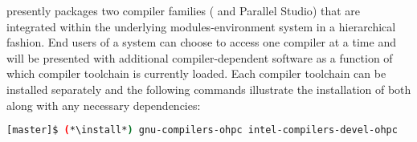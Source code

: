 \OHPC{} presently packages two compiler families ({\GNU{}} and {\Intel{}
  Parallel Studio}) that are integrated within the underlying
modules-environment system in a hierarchical fashion. End users of a \OHPC{}
system can choose to access one compiler at a time and will be presented with
additional compiler-dependent software as a function of which compiler
toolchain is currently loaded. Each compiler toolchain can be installed
separately and the following commands illustrate the installation of both along
with any necessary dependencies:

\begin{lstlisting}[language=bash]
[master]$ (*\install*) gnu-compilers-ohpc intel-compilers-devel-ohpc
\end{lstlisting}
